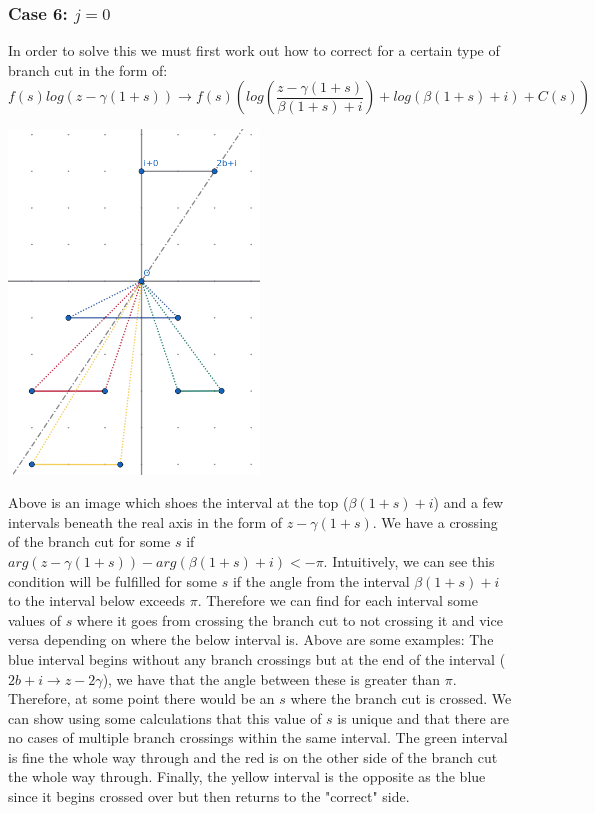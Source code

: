 \documentclass{article}
\begin{document}
\subsubsection{Case 6: $j=0$}
In order to solve this we must first work out how to correct for a certain type of branch cut in the form of:
$$f(s)log(z-\gamma(1+s)) \rightarrow f(s)(log(\frac{z-\gamma(1+s)}{\beta(1+s)+i})+log(\beta(1+s)+i)+C(s))$$
\begin{center}\includegraphics[width=0.5\textwidth]{bsi}\end{center}
Above is an image which shoes the interval at the top ($\beta(1+s)+i$) and a few intervals beneath the real axis in the form of $z-\gamma(1+s)$.
We have a crossing of the branch cut for some $s$ if $arg(z-\gamma(1+s))-arg(\beta(1+s)+i)<-\pi$.
Intuitively, we can see this condition will be fulfilled for some $s$ if the angle from the interval $\beta(1+s)+i$ to the interval below exceeds $\pi$.
Therefore we can find for each interval some values of $s$ where it goes from crossing the branch cut to not crossing it and vice versa depending on where the below interval is.
Above are some examples: The blue interval begins without any branch crossings but at the end of the interval ($2b+i\rightarrow z-2\gamma$), we have that the angle between these is greater than $\pi$.
Therefore, at some point there would be an $s$ where the branch cut is crossed.
We can show using some calculations that this value of $s$ is unique and that there are no cases of multiple branch crossings within the same interval.
The green interval is fine the whole way through and the red is on the other side of the branch cut the whole way through.
Finally, the yellow interval is the opposite as the blue since it begins crossed over but then returns to the "correct" side.
\end{document}
